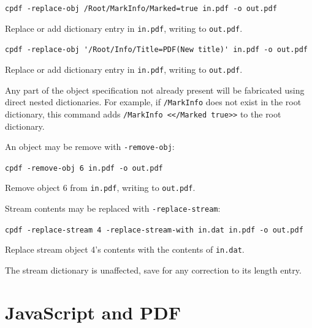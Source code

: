 \documentclass{book}
\begin{document}
  \begin{framed}
  \small\noindent\verb!cpdf -replace-obj /Root/MarkInfo/Marked=true in.pdf -o out.pdf!

  \vspace{2.5mm}
  \noindent Replace or add dictionary entry in \texttt{in.pdf}, writing to \texttt{out.pdf}. 

  \vspace{2.5mm}

  \small\noindent\verb!cpdf -replace-obj '/Root/Info/Title=PDF(New title)' in.pdf -o out.pdf!

  \vspace{2.5mm}
  \noindent Replace or add dictionary entry in \texttt{in.pdf}, writing to \texttt{out.pdf}. 

  \end{framed}

\noindent Any part of the object specification not already present will be fabricated using direct nested dictionaries. For example, if \texttt{/MarkInfo} does not exist in the root dictionary, this command adds \texttt{/MarkInfo <</Marked true>>} to the root dictionary.

An object may be remove with \texttt{-remove-obj}:

  \begin{framed}
  \small\noindent\verb!cpdf -remove-obj 6 in.pdf -o out.pdf!

  \vspace{2.5mm}
  \noindent Remove object 6 from \texttt{in.pdf}, writing to \texttt{out.pdf}. 
  \end{framed}


\noindent Stream contents may be replaced with \texttt{-replace-stream}:

  \begin{framed}
  \small\noindent\verb!cpdf -replace-stream 4 -replace-stream-with in.dat in.pdf -o out.pdf!

  \vspace{2.5mm}
  \noindent Replace stream object 4's contents with the contents of \texttt{in.dat}. 

  \end{framed}

\noindent The stream dictionary is unaffected, save for any correction to its length entry.

\section{JavaScript and PDF}
\end{document}
